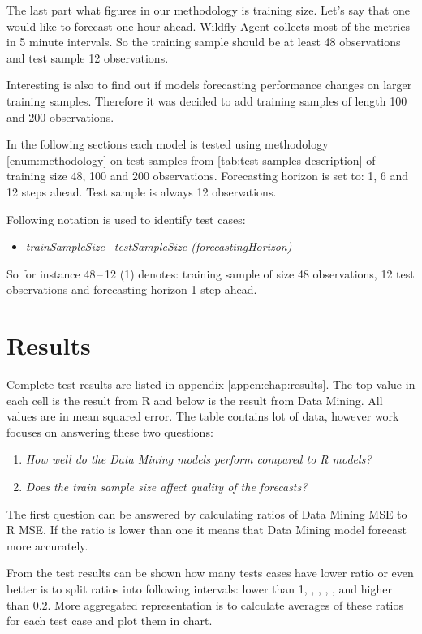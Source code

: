    The last part what figures in our methodology is training size. Let's say that one would like to forecast one hour
    ahead. Wildfly Agent collects most of the metrics in 5 minute intervals. So the training sample should be at
    least 48 observations and test sample 12 observations.

    Interesting is also to find out if models forecasting performance changes on larger training samples. Therefore it
    was decided to add training samples of length 100 and 200 observations.

    In the following sections each model is tested using methodology \ref{enum:methodology} on test samples from
    \ref{tab:test-samples-description} of training size 48, 100 and 200 observations.
    Forecasting horizon is set to: 1, 6 and 12 steps ahead. Test sample is always 12 observations.

    Following notation is used to identify test cases:
    \begin{itemize}
        \item \emph{trainSampleSize\,--\,testSampleSize (forecastingHorizon)}
    \end{itemize}
    So for instance 48\,--\,12 (1) denotes: training sample of size 48 observations, 12 test observations and
    forecasting horizon 1 step ahead.

    \section{Results}
    Complete test results are listed in appendix \ref{appen:chap:results}. The top value in each cell is the result
    from R and below is the result from Data Mining. All values are in mean squared error. The table contains lot of
    data, however work focuses on answering these two questions:

    \begin{enumerate}
        \item \emph{How well do the Data Mining models perform compared to R models?} \label{itm:question2}
        \item \emph{Does the train sample size affect quality of the forecasts?} \label{itm:question1}
    \end{enumerate}

    The first question can be answered by calculating ratios of Data Mining MSE to R MSE. If the ratio is lower than
    one it means that Data Mining model forecast more accurately.

    From the test results can be shown how many tests cases have lower ratio or even better is to split ratios into
    following intervals:
    lower than 1, \interval[{1,1.01}], \interval[{1.01,1.05}], \interval[{1.05,1.10}], \interval[{1.1,1.2}],
    and higher than 0.2. More aggregated representation is to calculate averages of these ratios for each test case and
    plot them in chart.

